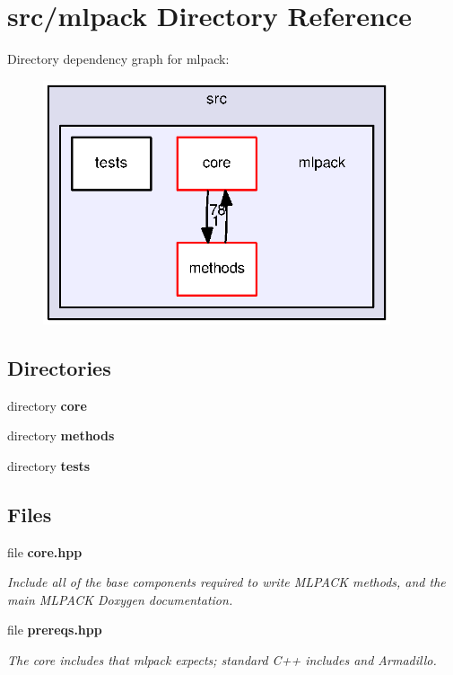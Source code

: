 \section{src/mlpack Directory Reference}
\label{dir_44a936ef30fc126706c6284a2fc0c990}
Directory dependency graph for mlpack\+:
\nopagebreak
\begin{figure}[H]
\begin{center}
\leavevmode
\includegraphics[width=290pt]{dir_44a936ef30fc126706c6284a2fc0c990_dep}
\end{center}
\end{figure}
\subsection*{Directories}
\begin{DoxyCompactItemize}
\item 
directory {\bf core}
\item 
directory {\bf methods}
\item 
directory {\bf tests}
\end{DoxyCompactItemize}
\subsection*{Files}
\begin{DoxyCompactItemize}
\item 
file {\bf core.\+hpp}
\begin{DoxyCompactList}\small\item\em Include all of the base components required to write M\+L\+P\+A\+CK methods, and the main M\+L\+P\+A\+CK Doxygen documentation. \end{DoxyCompactList}\item 
file {\bf prereqs.\+hpp}
\begin{DoxyCompactList}\small\item\em The core includes that mlpack expects; standard C++ includes and Armadillo. \end{DoxyCompactList}\end{DoxyCompactItemize}
